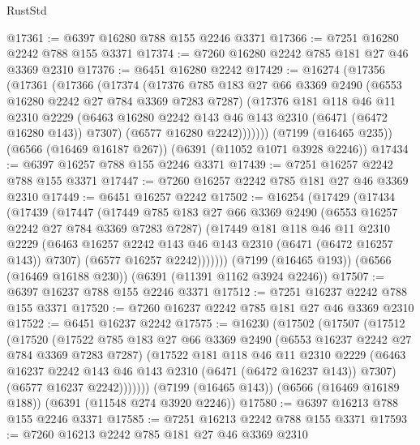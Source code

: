 \begin{lexlean}{RustStd}
\begin{coremodule}
{\begin{coremodule}
{{{{{{{{{{{{{{{{{{{{{{{{{{@17361 := @6397 @16280 @788 @155 @2246 @3371
@17366 := @7251 @16280 @2242 @788 @155 @3371
@17374 := @7260 @16280 @2242 @785 @181 @27 @46 @3369 @2310
@17376 := @6451 @16280 @2242
@17429 := @16274
    (@17356
      (@17361
        (@17366
          (@17374
            (@17376
              @785
              @183
              @27
              @66
              @3369
              @2490
              (@6553 @16280 @2242 @27 @784 @3369 @7283 @7287)
              (@17376
                @181
                @118
                @46
                @11
                @2310
                @2229
                (@6463 @16280 @2242 @143 @46 @143 @2310 (@6471 (@6472 @16280 @143)) @7307)
                (@6577 @16280 @2242)))))))
    (@7199 (@16465 @235))
    (@6566 (@16469 @16187 @267))
    (@6391 (@11052 @1071 @3928 @2246))
@17434 := @6397 @16257 @788 @155 @2246 @3371
@17439 := @7251 @16257 @2242 @788 @155 @3371
@17447 := @7260 @16257 @2242 @785 @181 @27 @46 @3369 @2310
@17449 := @6451 @16257 @2242
@17502 := @16254
    (@17429
      (@17434
        (@17439
          (@17447
            (@17449
              @785
              @183
              @27
              @66
              @3369
              @2490
              (@6553 @16257 @2242 @27 @784 @3369 @7283 @7287)
              (@17449
                @181
                @118
                @46
                @11
                @2310
                @2229
                (@6463 @16257 @2242 @143 @46 @143 @2310 (@6471 (@6472 @16257 @143)) @7307)
                (@6577 @16257 @2242)))))))
    (@7199 (@16465 @193))
    (@6566 (@16469 @16188 @230))
    (@6391 (@11391 @1162 @3924 @2246))
@17507 := @6397 @16237 @788 @155 @2246 @3371
@17512 := @7251 @16237 @2242 @788 @155 @3371
@17520 := @7260 @16237 @2242 @785 @181 @27 @46 @3369 @2310
@17522 := @6451 @16237 @2242
@17575 := @16230
    (@17502
      (@17507
        (@17512
          (@17520
            (@17522
              @785
              @183
              @27
              @66
              @3369
              @2490
              (@6553 @16237 @2242 @27 @784 @3369 @7283 @7287)
              (@17522
                @181
                @118
                @46
                @11
                @2310
                @2229
                (@6463 @16237 @2242 @143 @46 @143 @2310 (@6471 (@6472 @16237 @143)) @7307)
                (@6577 @16237 @2242)))))))
    (@7199 (@16465 @143))
    (@6566 (@16469 @16189 @188))
    (@6391 (@11548 @274 @3920 @2246))
@17580 := @6397 @16213 @788 @155 @2246 @3371
@17585 := @7251 @16213 @2242 @788 @155 @3371
@17593 := @7260 @16213 @2242 @785 @181 @27 @46 @3369 @2310
}}}}}}}}}}}}}}}}}}}}}}}}}}
\end{coremodule}}
\end{coremodule}
\end{lexlean}

